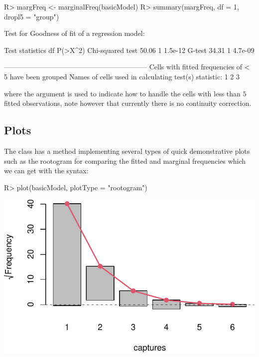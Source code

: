 \documentclass[
]{jss}
\newcommand{\1}{\mathcal{I}} \newcommand{\bZero}{\boldsymbol{0}}
\begin{document}
\begin{CodeChunk}
\begin{CodeInput}
R> margFreq <- marginalFreq(basicModel)
R> summary(margFreq, df = 1, dropl5 = "group")
\end{CodeInput}
\begin{CodeOutput}
Test for Goodness of fit of a regression model:

                 Test statistics df P(>X^2)
Chi-squared test           50.06  1 1.5e-12
G-test                     34.31  1 4.7e-09

-------------------------------------------------------------- 
Cells with fitted frequencies of < 5 have been grouped 
Names of cells used in calculating test(s) statistic: 1 2 3  
\end{CodeOutput}
\end{CodeChunk}

where the  argument is used to indicate how to handle the
cells with less than \(5\) fitted observations, note however that
currently there is no continuity correction.

\subsection{Plots}\label{plots}

The  class has a  method
implementing several types of quick demonstrative plots such as the
rootogram \cite{rootogram} for comparing the fitted and marginal
frequencies which we can get with the syntax:

\begin{CodeChunk}
\begin{CodeInput}
R> plot(basicModel, plotType = "rootogram")
\end{CodeInput}


\begin{center}\includegraphics{singleRcapture_files/figure-latex/rootogram-1} \end{center}

\end{CodeChunk}
\end{document}
